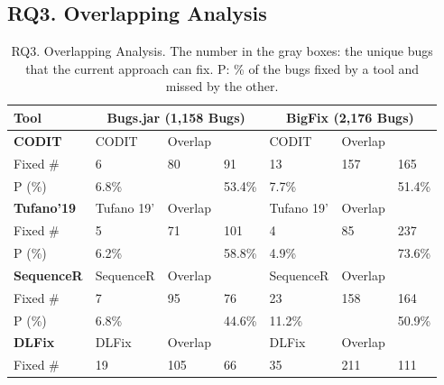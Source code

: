 \subsection{\bf RQ3. Overlapping Analysis}
\label{sec:overlap}

{\footnotesize{
\begin{table}[t]
  \caption{RQ3. Overlapping Analysis. The number in the gray boxes: the unique bugs that the current approach can fix. P: \% of the bugs fixed by a tool and missed by the other.}
  \vspace{-9pt}
	\begin{center}
		\renewcommand{\arraystretch}{1}
		\begin{tabular}{p{1cm}<{\centering}|p{1.1cm}<{\centering}|p{0.8cm}<{\centering}|p{0.7cm}<{\centering}|p{1.1cm}<{\centering}|p{0.8cm}<{\centering}|p{0.7cm}<{\centering}}\hline
			Tool &\multicolumn{3}{c|}{Bugs.jar (1,158 Bugs)}&\multicolumn{3}{c}{BigFix (2,176 Bugs)}\\
			\hline
			{\bf CODIT}             & CODIT   & Overlap   & \tool  & CODIT   & Overlap   & {\tool} \\
			\hline
			Fixed \#     & \cellcolor{mygray} 6  & 80   & \cellcolor{mygray} 91  & \cellcolor{mygray} 13 &  157  & \cellcolor{mygray} 165 \\
			P (\%)            & 6.8\%   &    & 53.4\%  & 7.7\%   &    & 51.4\% \\
			\hline
			{\bf Tufano'19}             & Tufano 19'   & Overlap   & \tool  & Tufano 19'   & Overlap   & \tool \\
			\hline
			Fixed \#     & \cellcolor{mygray} 5  &  71  & \cellcolor{mygray} 101 & \cellcolor{mygray}4 & 85   & \cellcolor{mygray}237 \\
			P (\%)            &  6.2\%  &    &  58.8\% &  4.9\%  &    & 73.6\% \\
			\hline
			{\bf SequenceR}             & SequenceR   & Overlap   & \tool  & SequenceR   & Overlap   & \tool \\
			\hline
			Fixed \#     & \cellcolor{mygray} 7  &   95 & \cellcolor{mygray} 76 & \cellcolor{mygray} 23 &  158  & \cellcolor{mygray} 164 \\
			P (\%)            &   6.8\% &    & 44.6\%  &   11.2\% &    & 50.9\% \\
			\hline
			{\bf DLFix} & DLFix   & Overlap   & \tool  & DLFix   & Overlap   & \tool \\
			\hline
			Fixed \#     & \cellcolor{mygray}  19 &  105  & \cellcolor{mygray} 66 & \cellcolor{mygray}35 &  211  & \cellcolor{mygray}111 \\

\end{tabular}
\end{center}
\end{table}}}
